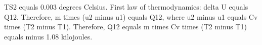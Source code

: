 TS2 equals 0.003 degrees Celsius.  
First law of thermodynamics: delta U equals Q12.  
Therefore, m times (u2 minus u1) equals Q12, where u2 minus u1 equals Cv times (T2 minus T1).  
Therefore, Q12 equals m times Cv times (T2 minus T1) equals minus 1.08 kilojoules.